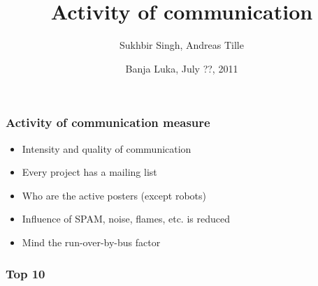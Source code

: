 \documentclass[compress]{beamer}
\title{Activity of communication}
\author{Sukhbir Singh, Andreas Tille}
\institute{\link{http://www.debconf.org/debconf8/}{Debian Conference 8}}
\date{Banja Luka, July ??, 2011}
\begin{document}
\begin{frame}
  \titlepage
\end{frame}

\begin{frame}
  \frametitle{Activity of communication measure}

  \begin{itemize}
     \item Intensity and quality of communication
     \item Every project has a mailing list
     \item Who are the active posters (except robots)
     \item Influence of SPAM, noise, flames, etc. is reduced
     \item Mind the run-over-by-bus factor
  \end{itemize}

\end{frame}

\begin{frame}
  \frametitle{Top 10 }
   \vspace{-5mm}

      \begin{center}
      \end{center}

\end{frame}
\end{document}
